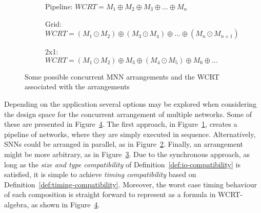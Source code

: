 \begin{figure}[h]
	\centering
	\begin{subfigure}[t]{0.5\textwidth}
		\centering
		\scalebox{0.8}{}
		\caption{Pipeline: $WCRT = M_1 \oplus M_2 \oplus M_3 \oplus \ldots \oplus M_n$}
		\label{fig:tca-nn-pipeline}
	\end{subfigure}
	
	\vspace{10mm}
	\begin{subfigure}[h]{0.5\textwidth}
		\centering
		\scalebox{0.8}{}
		\caption{Grid: $WCRT = \left(M_1 \odot M_2\right) \oplus \left(M_3 \odot M_4\right) \oplus \ldots \oplus \left(M_n \odot M_{n+1}\right)$}
		\label{fig:tca-nn-grid}
	\end{subfigure}
	
	\vspace{10mm}
	\begin{subfigure}[h]{0.5\textwidth}
		\centering
		\scalebox{0.8}{}
		\caption{2x1: $WCRT = \left(M_1 \odot M_2\right) \oplus M_3 \oplus \left(M_4 \odot M_5\right) \oplus M_6 \oplus \ldots$}
		\label{fig:tca-nn-someparallel}
	\end{subfigure}
	
	\caption{Some possible concurrent \ac{MNN} arrangements and the \ac{WCRT} associated with the arrangements}
	\label{fig:tca-nn}
\end{figure}

Depending on the application several options may be explored when
considering the design space for the concurrent arrangement of
multiple networks. Some of these are presented in Figure~\ref{fig:tca-nn}.
The first approach, in Figure~\ref{fig:tca-nn-pipeline}, creates a pipeline of networks, where they are simply executed in sequence.
Alternatively, \acp{SNN} could be arranged in parallel, as in Figure~\ref{fig:tca-nn-grid}. 
Finally, an arrangement might be more arbitrary, as in Figure~\ref{fig:tca-nn-someparallel}. 
Due to the synchronous approach, as long as the \emph{size and type
	compatibility} of Definition~\ref{def:io-compatibility} is
satisfied, it is simple to achieve \emph{timing compatibility} based on Definition~\ref{def:timing-compatibility}. 
Moreover, the worst case timing behaviour of each composition is
straight forward to represent as a formula in \ac{WCRT}-algebra, as
shown in Figure~\ref{fig:tca-nn}.

